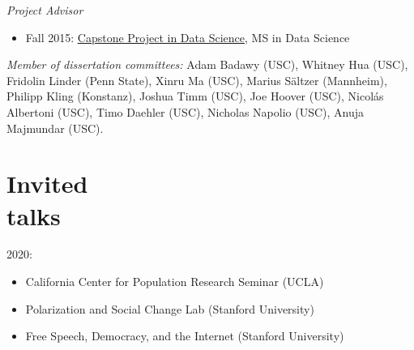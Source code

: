 \documentclass[margin,line,11pt]{resume}
\begin{document}
\begin{resume}
\emph{Project Advisor}
\begin{itemize}
\item Fall 2015: \href{http://cds.nyu.edu/academics/ms-in-data-science/curriculum/required-courses/#ds-ga-1006}{Capstone Project in Data Science}, MS in Data Science
\end{itemize}

\emph{Member of dissertation committees:} Adam Badawy (USC), Whitney Hua (USC), Fridolin Linder (Penn State), Xinru Ma (USC), Marius S\"{a}ltzer (Mannheim), Philipp Kling (Konstanz), Joshua Timm (USC), Joe Hoover (USC), Nicol\'{a}s Albertoni (USC), Timo Daehler (USC), Nicholas Napolio (USC), Anuja Majmundar (USC).




        \section{\mysidestyle Invited\\talks}
2020:
\begin{itemize}
\item California Center for Population Research Seminar (UCLA)
\item Polarization and Social Change Lab (Stanford University)
\item Free Speech, Democracy, and the Internet (Stanford University)
\end{itemize}    
    

\end{resume}
\end{document}
